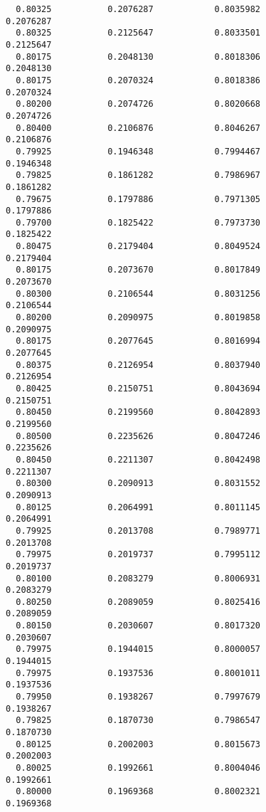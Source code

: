 \documentclass[
  letterpaper,
  DIV=11,
  numbers=noendperiod]{scrartcl}
\begin{document}
\begin{verbatim}
  0.80325           0.2076287            0.8035982            0.2076287     
  0.80325           0.2125647            0.8033501            0.2125647     
  0.80175           0.2048130            0.8018306            0.2048130     
  0.80175           0.2070324            0.8018386            0.2070324     
  0.80200           0.2074726            0.8020668            0.2074726     
  0.80400           0.2106876            0.8046267            0.2106876     
  0.79925           0.1946348            0.7994467            0.1946348     
  0.79825           0.1861282            0.7986967            0.1861282     
  0.79675           0.1797886            0.7971305            0.1797886     
  0.79700           0.1825422            0.7973730            0.1825422     
  0.80475           0.2179404            0.8049524            0.2179404     
  0.80175           0.2073670            0.8017849            0.2073670     
  0.80300           0.2106544            0.8031256            0.2106544     
  0.80200           0.2090975            0.8019858            0.2090975     
  0.80175           0.2077645            0.8016994            0.2077645     
  0.80375           0.2126954            0.8037940            0.2126954     
  0.80425           0.2150751            0.8043694            0.2150751     
  0.80450           0.2199560            0.8042893            0.2199560     
  0.80500           0.2235626            0.8047246            0.2235626     
  0.80450           0.2211307            0.8042498            0.2211307     
  0.80300           0.2090913            0.8031552            0.2090913     
  0.80125           0.2064991            0.8011145            0.2064991     
  0.79925           0.2013708            0.7989771            0.2013708     
  0.79975           0.2019737            0.7995112            0.2019737     
  0.80100           0.2083279            0.8006931            0.2083279     
  0.80250           0.2089059            0.8025416            0.2089059     
  0.80150           0.2030607            0.8017320            0.2030607     
  0.79975           0.1944015            0.8000057            0.1944015     
  0.79975           0.1937536            0.8001011            0.1937536     
  0.79950           0.1938267            0.7997679            0.1938267     
  0.79825           0.1870730            0.7986547            0.1870730     
  0.80125           0.2002003            0.8015673            0.2002003     
  0.80025           0.1992661            0.8004046            0.1992661     
  0.80000           0.1969368            0.8002321            0.1969368     

\end{verbatim}
\end{document}
